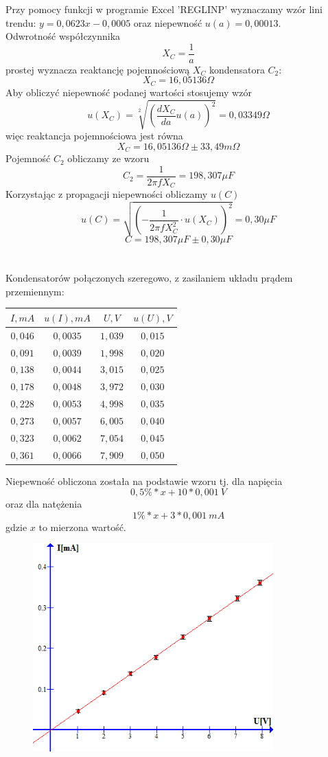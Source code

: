 \documentclass{article}
\begin{document}
Przy pomocy funkcji w programie Excel 'REGLINP' wyznaczamy wzór lini trendu: $y = 0,0623x - 0,0005$ oraz niepewność $u(a) = 0,00013$.\\
Odwrotność współczynnika 
$$X_C = \frac{1}{a}$$
prostej wyznacza reaktancję pojemnościową $X_C$ kondensatora $C_2$:
$$X_C = 16,05136 \Omega$$ 
Aby obliczyć niepewność podanej wartości stosujemy wzór
$$u(X_C) = \sqrt[2]{(\frac{dX_C}{da}u(a))^2} = 0,03349 \Omega$$
więc reaktancja pojemnościowa jest równa
$$X_C = 16,05136 \Omega \pm 33,49 m \Omega$$
Pojemność $C_2$ obliczamy ze wzoru
$$C_2 = \frac{1}{2\pi fX_C} = 198,307 \mu F$$
Korzystając z propagacji niepewności obliczamy $u(C)$
$$u(C) = \sqrt{(-\frac{1}{2\pi f X_C^2} \cdot u(X_C))^2} = 0,30 \mu F$$
$$C = 198,307 \mu F \pm 0,30 \mu F$$
\\\\
Kondensatorów połączonych szeregowo, z zasilaniem układu prądem przemiennym:
\begin{center}
    \begin{tabular}{|c|c|c|c|}
    \hline
$I,mA$ & $u(I), mA$ & $U,V$ & $u(U), V$\\ \hline
$0,046$ & $0,0035$ & $1,039$ & $0,015$\\ \hline
$0,091$ & $0,0039$ & $1,998$ & $0,020$\\ \hline
$0,138$ & $0,0044$ & $3,015$ & $0,025$\\ \hline
$0,178$ & $0,0048$ & $3,972$ & $0,030$\\ \hline
$0,228$ & $0,0053$ & $4,998$ & $0,035$\\ \hline
$0,273$ & $0,0057$ & $6,005$ & $0,040$\\ \hline
$0,323$ & $0,0062$ & $7,054$ & $0,045$\\ \hline
$0,361$ & $0,0066$ & $7,909$ & $0,050$\\ \hline
    \end{tabular}
\end{center}
Niepewność obliczona została na podstawie wzoru tj. dla napięcia
$$0,5\% * x + 10 * 0,001\ V $$
oraz dla natężenia
$$1\% * x + 3 * 0,001\ mA$$
gdzie $x$ to mierzona wartość.
\begin{figure}[ht]
\centering
\includegraphics[height=8cm]{wykres_6.png}
\end{figure}\\
\end{document}
